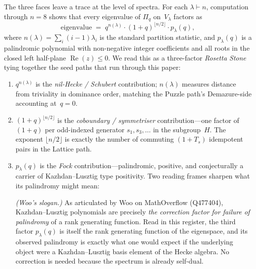 \begin{remark}
\label{rem:rosetta-stone}
The three faces leave a trace at the level of spectra.  For each
$\lambda \vdash n$, computation through $n = 8$ shows that every
eigenvalue of $\Pi_q$ on~$V_\lambda$ factors as
\[
  \text{eigenvalue}
  \;=\; q^{n(\lambda)} \cdot (1+q)^{\lfloor n/2 \rfloor}
        \cdot p_\lambda(q),
\]
where $n(\lambda) = \sum_i (i-1)\lambda_i$ is the standard partition
statistic, and $p_\lambda(q)$ is a palindromic polynomial with
non-negative integer coefficients and all roots in the closed left
half-plane $\operatorname{Re}(z) \leq 0$.  We read this as a three-factor
\emph{Rosetta Stone} tying together the seed paths that run through
this paper:
\begin{enumerate}[label=(\roman*)]
\item $q^{n(\lambda)}$ is the \emph{nil-Hecke / Schubert} contribution;
  $n(\lambda)$ measures distance from triviality in dominance order,
  matching the Puzzle path's Demazure-side accounting at~$q = 0$.
\item $(1+q)^{\lfloor n/2 \rfloor}$ is the \emph{coboundary /
  symmetriser} contribution---one factor of~$(1+q)$ per odd-indexed
  generator $s_1, s_3, \ldots$ in the subgroup~$H$.  The exponent
  $\lfloor n/2 \rfloor$ is exactly the number of commuting
  $(1 + T_s)$ idempotent pairs in the Lattice path.
\item $p_\lambda(q)$ is the \emph{Fock} contribution---palindromic,
  positive, and conjecturally a carrier of Kazhdan--Lusztig type
  positivity.  Two reading frames sharpen what its palindromy might
  mean:

  \emph{(Woo's slogan.)} As articulated by Woo on MathOverflow
  (Q477404), Kazhdan--Lusztig polynomials are precisely \emph{the
  correction factor for failure of palindromy} of a rank generating
  function.  Read in this register, the third factor $p_\lambda(q)$
  is itself the rank generating function of the eigenspace, and its
  observed palindromy is exactly what one would expect if the
  underlying object were a Kazhdan--Lusztig basis element of the
  Hecke algebra.  No correction is needed because the spectrum is
  already self-dual.


\end{enumerate}
\end{remark}
